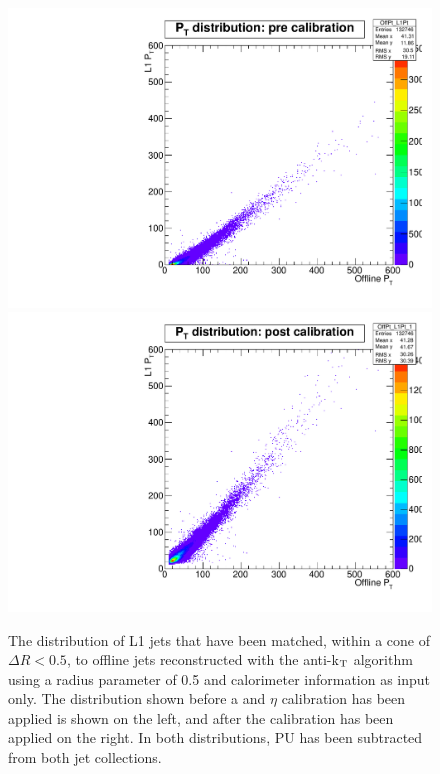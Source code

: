 \begin{figure}[t!]
\begin{center}
  \includegraphics[scale=0.32]{Figures/l1jets/PreCalib.pdf}
  \includegraphics[scale=0.32]{Figures/l1jets/PostCalib.pdf}
\caption{The \pt distribution of \ac{L1} jets that have been matched, within a cone of $\Delta R<0.5$, to offline jets reconstructed with the anti-k$_{\rm T}$ algorithm using a radius parameter of 0.5 and calorimeter information as input only. The distribution shown before a \pt and $\eta$ calibration has been applied is shown on the left, and after the calibration has been applied on the right. In both distributions, \ac{PU} has been subtracted from both jet collections. }
\label{prepostCalib}
\end{center}
\end{figure}



